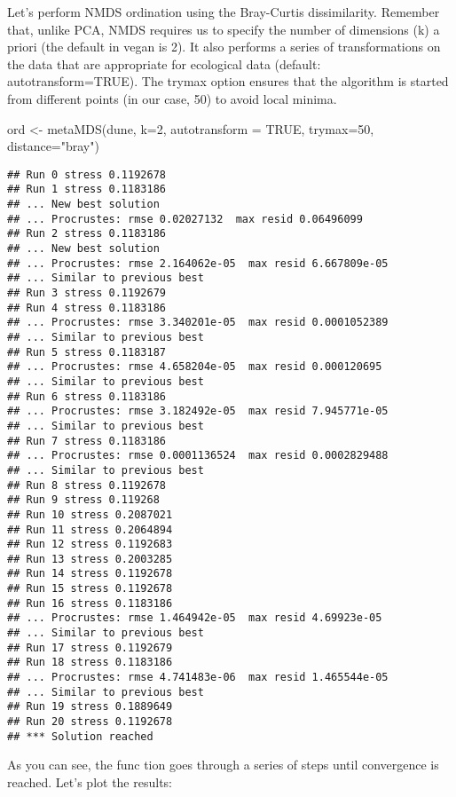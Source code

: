 \documentclass[
]{book}
\newenvironment{Shaded}{\begin{snugshade}}{\end{snugshade}}
\newcommand{\AttributeTok}[1]{\textcolor[rgb]{0.77,0.63,0.00}{#1}}
\newcommand{\ConstantTok}[1]{\textcolor[rgb]{0.00,0.00,0.00}{#1}}
\newcommand{\DecValTok}[1]{\textcolor[rgb]{0.00,0.00,0.81}{#1}}
\newcommand{\FunctionTok}[1]{\textcolor[rgb]{0.00,0.00,0.00}{#1}}
\newcommand{\NormalTok}[1]{#1}
\newcommand{\OtherTok}[1]{\textcolor[rgb]{0.56,0.35,0.01}{#1}}
\newcommand{\StringTok}[1]{\textcolor[rgb]{0.31,0.60,0.02}{#1}}
\begin{document}
Let's perform NMDS ordination using the Bray-Curtis dissimilarity. Remember that, unlike PCA, NMDS requires us to specify the number of dimensions (k) a priori (the default in vegan is 2). It also performs a series of transformations on the data that are appropriate for ecological data (default: autotransform=TRUE). The trymax option ensures that the algorithm is started from different points (in our case, 50) to avoid local minima.

\begin{Shaded}
\begin{Highlighting}[]
\NormalTok{ord }\OtherTok{\textless{}{-}} \FunctionTok{metaMDS}\NormalTok{(dune, }\AttributeTok{k=}\DecValTok{2}\NormalTok{, }\AttributeTok{autotransform =} \ConstantTok{TRUE}\NormalTok{, }\AttributeTok{trymax=}\DecValTok{50}\NormalTok{, }\AttributeTok{distance=}\StringTok{"bray"}\NormalTok{)}
\end{Highlighting}
\end{Shaded}

\begin{verbatim}
## Run 0 stress 0.1192678 
## Run 1 stress 0.1183186 
## ... New best solution
## ... Procrustes: rmse 0.02027132  max resid 0.06496099 
## Run 2 stress 0.1183186 
## ... New best solution
## ... Procrustes: rmse 2.164062e-05  max resid 6.667809e-05 
## ... Similar to previous best
## Run 3 stress 0.1192679 
## Run 4 stress 0.1183186 
## ... Procrustes: rmse 3.340201e-05  max resid 0.0001052389 
## ... Similar to previous best
## Run 5 stress 0.1183187 
## ... Procrustes: rmse 4.658204e-05  max resid 0.000120695 
## ... Similar to previous best
## Run 6 stress 0.1183186 
## ... Procrustes: rmse 3.182492e-05  max resid 7.945771e-05 
## ... Similar to previous best
## Run 7 stress 0.1183186 
## ... Procrustes: rmse 0.0001136524  max resid 0.0002829488 
## ... Similar to previous best
## Run 8 stress 0.1192678 
## Run 9 stress 0.119268 
## Run 10 stress 0.2087021 
## Run 11 stress 0.2064894 
## Run 12 stress 0.1192683 
## Run 13 stress 0.2003285 
## Run 14 stress 0.1192678 
## Run 15 stress 0.1192678 
## Run 16 stress 0.1183186 
## ... Procrustes: rmse 1.464942e-05  max resid 4.69923e-05 
## ... Similar to previous best
## Run 17 stress 0.1192679 
## Run 18 stress 0.1183186 
## ... Procrustes: rmse 4.741483e-06  max resid 1.465544e-05 
## ... Similar to previous best
## Run 19 stress 0.1889649 
## Run 20 stress 0.1192678 
## *** Solution reached
\end{verbatim}

As you can see, the func tion goes through a series of steps until convergence is reached. Let's plot the results:
\end{document}
